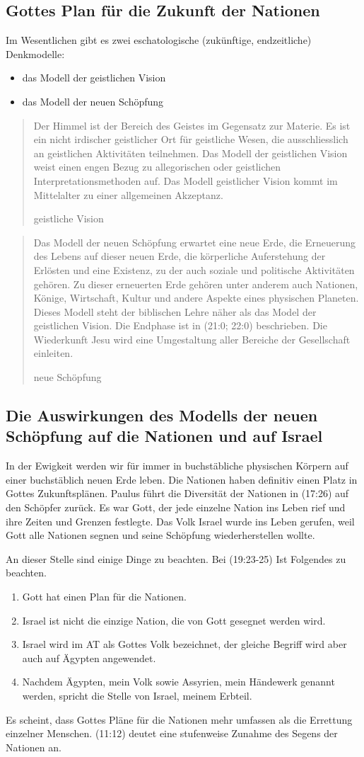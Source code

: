 \documentclass[fontsize=14pt]{../../inc/mybib}
\begin{document}
\subsection{Gottes Plan für die Zukunft der Nationen}
Im Wesentlichen gibt es zwei eschatologische (zukünftige, endzeitliche) Denkmodelle:
\begin{itemize}
    \item das Modell der geistlichen Vision
    \item das Modell der neuen Schöpfung
\end{itemize}
\blockquote[geistliche Vision]{Der Himmel ist der Bereich des Geistes im Gegensatz zur Materie. Es ist ein nicht irdischer geistlicher Ort für geistliche Wesen, die ausschliesslich an geistlichen Aktivitäten teilnehmen. Das Modell der geistlichen Vision weist einen engen Bezug zu allegorischen oder geistlichen Interpretationsmethoden auf. Das Modell geistlicher Vision kommt im Mittelalter zu einer allgemeinen Akzeptanz.}
\blockquote[neue Schöpfung]{Das Modell der neuen Schöpfung erwartet eine neue Erde, die Erneuerung des Lebens auf dieser neuen Erde, die körperliche Auferstehung der Erlösten und eine Existenz, zu der auch soziale und politische Aktivitäten gehören. Zu dieser erneuerten Erde gehören unter anderem auch Nationen, Könige, Wirtschaft, Kultur und andere Aspekte eines physischen Planeten. Dieses Modell steht der biblischen Lehre näher als das Model der geistlichen Vision. Die Endphase ist in (21:0; 22:0) beschrieben. Die Wiederkunft Jesu wird eine Umgestaltung aller Bereiche der Gesellschaft einleiten.}
\subsection{Die Auswirkungen des Modells der neuen Schöpfung auf die Nationen und auf Israel}
In der Ewigkeit werden wir für immer in buchstäbliche physischen Körpern auf einer buchstäblich neuen Erde leben. Die Nationen haben definitiv einen Platz in Gottes Zukunftsplänen. Paulus führt die Diversität der Nationen in (17:26) auf den Schöpfer zurück. Es war Gott, der jede einzelne Nation ins Leben rief und ihre Zeiten und Grenzen festlegte. Das Volk Israel wurde ins Leben gerufen, weil Gott alle Nationen segnen und seine Schöpfung wiederherstellen wollte.

An dieser Stelle sind einige Dinge zu beachten. 
Bei (19:23-25) Ist Folgendes zu beachten. 
\begin{enumerate}
    \item Gott hat einen Plan für die Nationen.
    \item Israel ist nicht die einzige Nation, die von Gott gesegnet werden wird.
    \item Israel wird im AT als Gottes Volk bezeichnet, der gleiche Begriff wird aber auch auf Ägypten angewendet.
    \item Nachdem Ägypten, mein Volk sowie Assyrien, mein Händewerk genannt werden, spricht die Stelle von Israel, meinem Erbteil.
\end{enumerate}
Es scheint, dass Gottes Pläne für die Nationen mehr umfassen als die Errettung einzelner Menschen. (11:12) deutet eine stufenweise Zunahme des Segens der Nationen an.
\end{document}
